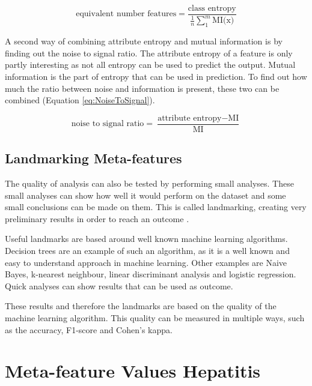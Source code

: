 \documentclass[10pt,a4paper]{report}
\begin{document}
\begin{itemize}
		\begin{equation}\label{eq:EqNumFeat}
		\text{equivalent number features} = \frac{\text{class entropy}}{\frac{1}{n}\sum_1^m\text{MI(x)}}
		\end{equation}
		
		A second way of combining attribute entropy and mutual information is by finding out the noise to signal ratio. The attribute entropy of a feature is only partly interesting as not all entropy can be used to predict the output. Mutual information is the part of entropy that can be used in prediction. To find out how much the ratio between noise and information is present, these two can be combined (Equation \ref{eq:NoiseToSignal}).
		
		\begin{equation}\label{eq:NoiseToSignal}
		\text{noise to signal ratio} = \frac{\text{attribute entropy} - \text{MI}}{\text{MI}}
		\end{equation}
		
	\end{itemize}
	
	\subsection{Landmarking Meta-features}
	\label{subsec:LandmarkingMF}
	
	The quality of analysis can also be tested by performing small analyses. These small analyses can show how well it would perform on the dataset and some small conclusions can be made on them. This is called landmarking, creating very preliminary results in order to reach an outcome \cite{pfahringer2000meta}.
	
	Useful landmarks are based around well known machine learning algorithms. Decision trees are an example of such an algorithm, as it is a well known and easy to understand approach in machine learning.  Other examples are Naive Bayes, k-nearest neighbour, linear discriminant analysis and logistic regression. Quick analyses can show results that can be used as outcome.
	
	These results and therefore the landmarks are based on the quality of the machine learning algorithm. This quality can be measured in multiple ways, such as the accuracy, F1-score and Cohen's kappa.
	
	\section{Meta-feature Values Hepatitis}
	\label{app:MetafeatureValuesHepatitis}
	
\end{document}
